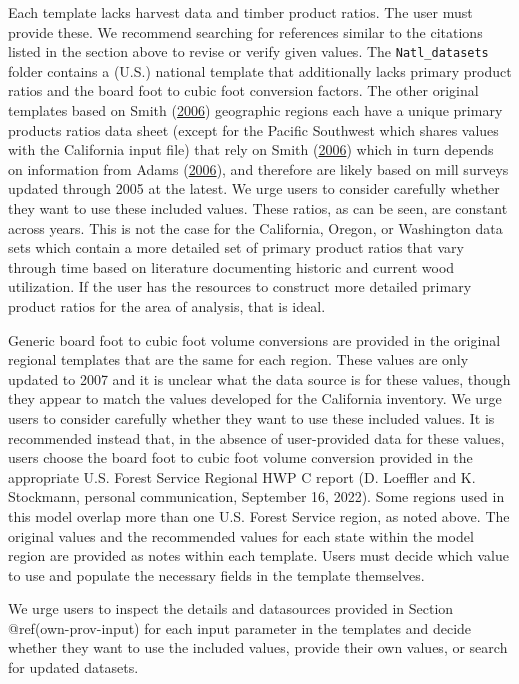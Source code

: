 \documentclass[
  openany]{book}
\begin{document}
Each template lacks harvest data and timber product ratios. The user
must provide these. We recommend searching for references similar to the
citations listed in the section above to revise or verify given values.
The \texttt{Natl\_datasets} folder contains a (U.S.) national template
that additionally lacks primary product ratios and the board foot to
cubic foot conversion factors. The other original templates based on
Smith (\protect\hyperlink{ref-smith2006}{2006}) geographic regions each
have a unique primary products ratios data sheet (except for the Pacific
Southwest which shares values with the California input file) that rely
on Smith (\protect\hyperlink{ref-smith2006}{2006}) which in turn depends
on information from Adams (\protect\hyperlink{ref-adams2006}{2006}), and
therefore are likely based on mill surveys updated through 2005 at the
latest. We urge users to consider carefully whether they want to use
these included values. These ratios, as can be seen, are constant across
years. This is not the case for the California, Oregon, or Washington
data sets which contain a more detailed set of primary product ratios
that vary through time based on literature documenting historic and
current wood utilization. If the user has the resources to construct
more detailed primary product ratios for the area of analysis, that is
ideal.

Generic board foot to cubic foot volume conversions are provided in the
original regional templates that are the same for each region. These
values are only updated to 2007 and it is unclear what the data source
is for these values, though they appear to match the values developed
for the California inventory. We urge users to consider carefully
whether they want to use these included values. It is recommended
instead that, in the absence of user-provided data for these values,
users choose the board foot to cubic foot volume conversion provided in
the appropriate U.S. Forest Service Regional HWP C report (D. Loeffler
and K. Stockmann, personal communication, September 16, 2022). Some
regions used in this model overlap more than one U.S. Forest Service
region, as noted above. The original values and the recommended values
for each state within the model region are provided as notes within each
template. Users must decide which value to use and populate the
necessary fields in the template themselves.

We urge users to inspect the details and datasources provided in Section
@ref(own-prov-input) for each input parameter in the templates and
decide whether they want to use the included values, provide their own
values, or search for updated datasets.
\end{document}
